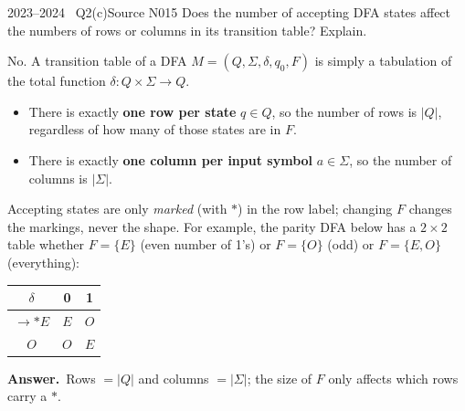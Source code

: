 \documentclass[11pt,a4paper]{article}
\newcommand{\ans}[1]{\par\smallskip\noindent\colorbox{mist}{\parbox{\dimexpr\linewidth-2\fboxsep}{\sffamily\small\textbf{\color{teal}Answer.}\ \color{ink}#1}}\par}
\begin{document}
\begin{question}{2023--2024 \textbullet\ Q2(c)}{Source N01}{5}
Does the number of accepting DFA states affect the numbers of rows or columns in its transition table? Explain.
\end{question}
\begin{solution}
No. A transition table of a DFA $M=(Q,\Sigma,\delta,q_0,F)$ is simply a tabulation of the total function
$\delta:Q\times\Sigma\to Q$.
\begin{itemize}
\item There is exactly \textbf{one row per state} $q\in Q$, so the number of rows is $|Q|$, regardless of how many of those states are in $F$.
\item There is exactly \textbf{one column per input symbol} $a\in\Sigma$, so the number of columns is $|\Sigma|$.
\end{itemize}
Accepting states are only \emph{marked} (with $*$) in the row label; changing $F$ changes the markings, never the shape.
For example, the parity DFA below has a $2\times 2$ table whether $F=\{E\}$ (even number of 1's) or $F=\{O\}$ (odd) or $F=\{E,O\}$ (everything):
\begin{center}\small
\begin{tabular}{c|cc}\toprule $\delta$ & 0 & 1\\\midrule $\to *E$ & $E$ & $O$\\ $O$ & $O$ & $E$\\\bottomrule\end{tabular}
\end{center}
\ans{Rows $=|Q|$ and columns $=|\Sigma|$; the size of $F$ only affects which rows carry a $*$.}
\end{solution}
\end{document}
